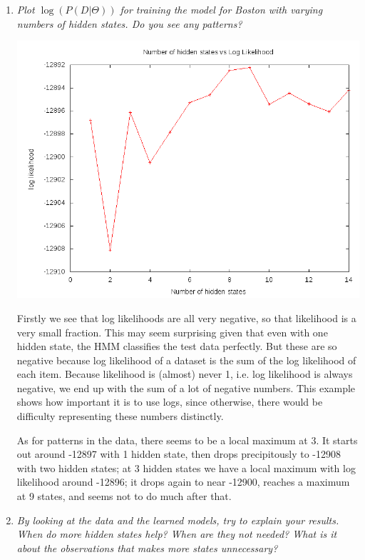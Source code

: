 \documentclass{article}
\begin{document}
\begin{enumerate}[(a)]
\begin{enumerate}
\begin{itemize}
    \end{itemize}

  \item \emph{Plot $\log(P(D|\Theta))$ for training the model for Boston with
    varying numbers of hidden states. Do you see any patterns?}

    \begin{center}
      \includegraphics[scale=0.5]{4civ_plot.png}
    \end{center}

    Firstly we see that log likelihoods are all very negative, so that
    likelihood is a very small fraction. This may seem surprising
    given that even with one hidden state, the HMM classifies the test
    data perfectly. But these are so negative because log likelihood
    of a dataset is the sum of the log likelihood of each
    item. Because likelihood is (almost) never 1, i.e. log likelihood
    is always negative, we end up with the sum of a lot of negative
    numbers.  This example shows how important it is to use logs,
    since otherwise, there would be difficulty representing these
    numbers distinctly.

    As for patterns in the data, there seems to be a local maximum at
    3. It starts out around -12897 with 1 hidden state, then drops
    precipitously to -12908 with two hidden states; at 3 hidden states
    we have a local maximum with log likelihood around -12896; it
    drops again to near -12900, reaches a maximum at 9 states, and
    seems not to do much after that.

  \item \emph{By looking at the data and the learned models, try to explain your
    results. When do more hidden states help? When are they not needed? What is
    it about the observations that makes more states unnecessary?}


\end{enumerate}
\end{enumerate}
\end{document}
